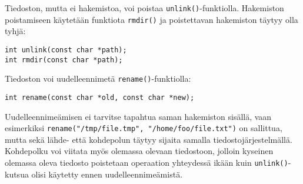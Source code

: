 Tiedoston, mutta ei hakemistoa, voi poistaa \texttt{unlink()}-funktiolla.
Hakemiston poistamiseen käytetään funktiota \texttt{rmdir()} ja poistettavan hakemiston täytyy olla tyhjä:
%
\begin{verbatim}
int unlink(const char *path);
int rmdir(const char *path);
\end{verbatim}
%
Tiedoston voi uudelleennimetä \texttt{rename()}-funktiolla:
%
\begin{verbatim}
int rename(const char *old, const char *new);
\end{verbatim}
%
Uudelleennimeämisen ei tarvitse tapahtua saman hakemiston sisällä,
vaan esimerkiksi \texttt{rename("/tmp/file.tmp", "/home/foo/file.txt")} on sallittua,
mutta sekä lähde- että kohdepolun täytyy sijaita samalla tiedostojärjestelmällä.
Kohdepolku voi viitata myös olemassa olevaan tiedostoon,
jolloin kyseinen olemassa oleva tiedosto poistetaan operaation yhteydessä ikään kuin \texttt{unlink()}-kutsua olisi käytetty ennen uudelleennimeämistä.

